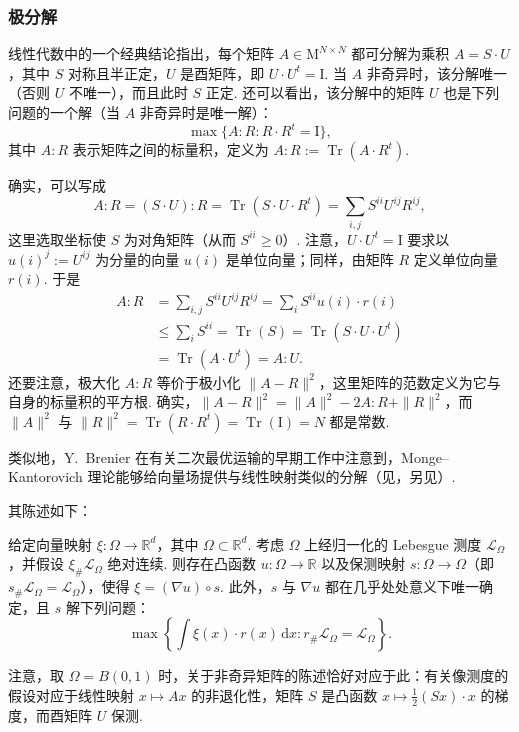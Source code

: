 \subsubsection{极分解}\label{sec:1.7.2}

线性代数中的一个经典结论指出，每个矩阵 $A\in\mathrm M^{N\times N}$ 都可分解为乘积 $A=S\cdot U$，其中 $S$ 对称且半正定，$U$ 是酉矩阵，即 $U\cdot U^t=\mathrm{I}$. 当 $A$ 非奇异时，该分解唯一（否则 $U$ 不唯一），而且此时 $S$ 正定. 还可以看出，该分解中的矩阵 $U$ 也是下列问题的一个解（当 $A$ 非奇异时是唯一解）：
\[
 \max\{A:R:R\cdot R^t=\mathrm{I}\},
\]
其中 $A:R$ 表示矩阵之间的标量积，定义为 $A:R:=\operatorname{Tr}(A\cdot R^t)$.

确实，可以写成
\[
 A:R=(S\cdot U):R
 =\operatorname{Tr}(S\cdot U\cdot R^t)
 =\sum_{i,j}S^{ii}U^{ij}R^{ij},
\]
这里选取坐标使 $S$ 为对角矩阵（从而 $S^{ii}\geq0$）. 注意，$U\cdot U^t=\mathrm{I}$ 要求以 $u(i)^j:=U^{ij}$ 为分量的向量 $u(i)$ 是单位向量；同样，由矩阵 $R$ 定义单位向量 $r(i)$. 于是
\begin{equation*}
\begin{aligned}
 A:R
 &=\sum_{i,j}S^{ii}U^{ij}R^{ij}
   =\sum_i S^{ii}u(i)\cdot r(i)\\
 &\leq\sum_i S^{ii}
   =\operatorname{Tr}(S)
   =\operatorname{Tr}(S\cdot U\cdot U^t)\\
 &=\operatorname{Tr}(A\cdot U^t)=A:U.
\end{aligned}
\end{equation*}
还要注意，极大化 $A:R$ 等价于极小化 $\|A-R\|^2$，这里矩阵的范数定义为它与自身的标量积的平方根. 确实，$\|A-R\|^2=\|A\|^2-2A:R+\|R\|^2$，而 $\|A\|^2$ 与 $\|R\|^2=\operatorname{Tr}(R\cdot R^t)=\operatorname{Tr}(\mathrm{I})=N$ 都是常数.

类似地，Y.~Brenier 在有关二次最优运输的早期工作中注意到，Monge--Kantorovich 理论能够给向量场提供与线性映射类似的分解（见\cite{b82,b84}，另见\cite{b174}）.

其陈述如下：
\begin{theorem}\label{obj:1.53}
给定向量映射 $\xi:\Omega\to\mathbb R^d$，其中 $\Omega\subset\mathbb R^d$. 考虑 $\Omega$ 上经归一化的 Lebesgue 测度 $\mathscr L_\Omega$，并假设 $\xi_\#\mathscr L_\Omega$ 绝对连续. 则存在凸函数 $u:\Omega\to\mathbb R$ 以及保测映射 $s:\Omega\to\Omega$（即 $s_\#\mathscr L_\Omega=\mathscr L_\Omega$），使得 $\xi=(\nabla u)\circ s$. 此外，$s$ 与 $\nabla u$ 都在几乎处处意义下唯一确定，且 $s$ 解下列问题：
\[
 \max\left\{\int\xi(x)\cdot r(x)\,\mathrm dx:
                 r_\#\mathscr L_\Omega=\mathscr L_\Omega\right\}.
\]
\end{theorem}
注意，取 $\Omega=B(0,1)$ 时，关于非奇异矩阵的陈述恰好对应于此：有关像测度的假设对应于线性映射 $x\mapsto Ax$ 的非退化性，矩阵 $S$ 是凸函数 $x\mapsto\frac12(Sx)\cdot x$ 的梯度，而酉矩阵 $U$ 保测.

